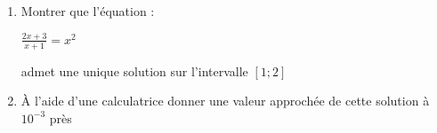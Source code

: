 
%
\begin{enumerate}
     \item
     Montrer que l'équation :

\begin{center}
     $\frac{2x+3}{x+1}=x^2$
\end{center}

     admet une unique solution sur l'intervalle $[1;2]$
     \item
     À l'aide d'une calculatrice donner une valeur approchée de cette solution à $10^{-3}$ près
\end{enumerate}
\begin{corrige}
\end{corrige}
